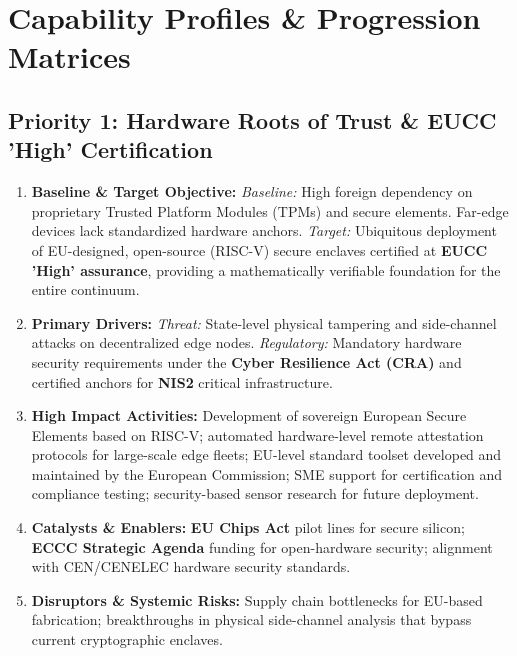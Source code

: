 \documentclass[12pt,a4paper]{article}
\begin{document}
\section{Capability Profiles \& Progression Matrices}

\subsection*{Priority 1: Hardware Roots of Trust \& EUCC 'High' Certification}

\begin{enumerate}
\item \textbf{Baseline \& Target Objective:}
\textit{Baseline:} High foreign dependency on proprietary Trusted Platform Modules (TPMs) and secure elements. Far-edge devices lack standardized hardware anchors.
\textit{Target:} Ubiquitous deployment of EU-designed, open-source (RISC-V) secure enclaves certified at \textbf{EUCC 'High' assurance}, providing a mathematically verifiable foundation for the entire continuum.

\item \textbf{Primary Drivers:} 
\textit{Threat:} State-level physical tampering and side-channel attacks on decentralized edge nodes. 
\textit{Regulatory:} Mandatory hardware security requirements under the \textbf{Cyber Resilience Act (CRA)} and certified anchors for \textbf{NIS2} critical infrastructure.

\item \textbf{High Impact Activities:} 
Development of sovereign European Secure Elements based on RISC-V; automated hardware-level remote attestation protocols for large-scale edge fleets; EU-level standard toolset developed and maintained by the European Commission; SME support for certification and compliance testing; security-based sensor research for future deployment.

\item \textbf{Catalysts \& Enablers:} 
\textbf{EU Chips Act} pilot lines for secure silicon; \textbf{ECCC Strategic Agenda} funding for open-hardware security; alignment with CEN/CENELEC hardware security standards.

\item \textbf{Disruptors \& Systemic Risks:} 
Supply chain bottlenecks for EU-based fabrication; breakthroughs in physical side-channel analysis that bypass current cryptographic enclaves.


\end{enumerate}
\end{document}
